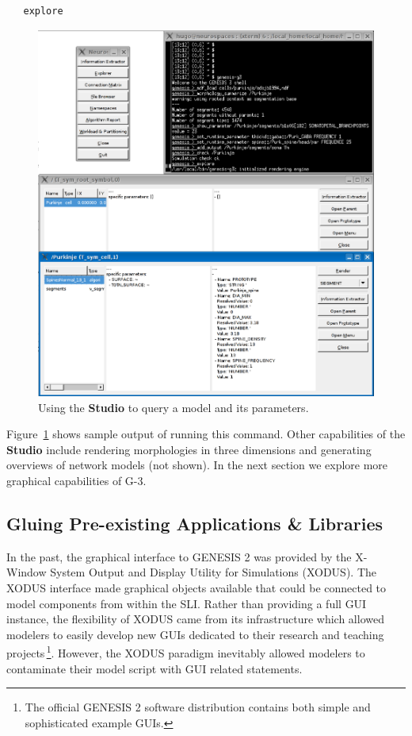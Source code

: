 \documentclass[12pt]{article}
\begin{document}
{\footnotesize
\begin{verbatim}
   explore
\end{verbatim}
}

\begin{figure}[ht]
  \centering
  \includegraphics[scale=0.3]{figures/studio-screenshot.eps}
  \caption{Using the {\bf Studio} to query a model and its
    parameters.}
  \label{fig:cbi-studio}
\end{figure}

Figure~\ref{fig:cbi-studio} shows sample output of running this
command.  Other capabilities of the {\bf Studio} include rendering
morphologies in three dimensions and generating overviews of network
models (not shown).  In the next section we explore more graphical
capabilities of G-3.

\subsection{Gluing Pre-existing Applications \& Libraries}

In the past, the graphical interface to GENESIS 2 was provided by the
X-Window System Output and Display Utility for Simulations (XODUS).  The
XODUS interface made graphical objects available that could be
connected to model components from within the SLI.  Rather than
providing a full GUI instance, the flexibility of XODUS came from its
infrastructure which allowed modelers to easily develop new GUIs
dedicated to their research and teaching projects\,\footnote{The
  official GENESIS 2 software distribution contains both simple and
  sophisticated example GUIs.}.  However, the XODUS paradigm
inevitably allowed modelers to contaminate their model script with GUI
related statements.
\end{document}
